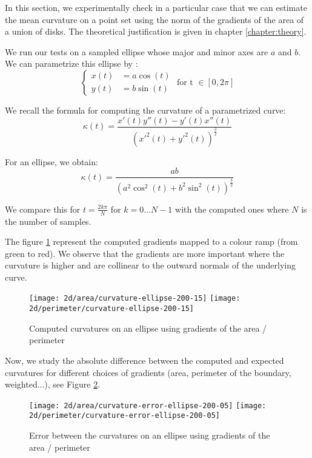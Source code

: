 In this section, we experimentally check in a particular case that we can
estimate the mean curvature on a point set using the norm of the gradients of
the area of a union of disks. The theoretical justification is given in chapter
\ref{chapter:theory}.

We run our tests on a sampled ellipse whose major and minor axes are $ a $ and $
b $. We can parametrize this ellipse by :
$$
\begin{cases}
    x(t) &= a \cos (t) \\
    y(t) &= b \sin (t)
\end{cases}
\text{ for t } \in [ 0, 2\pi ]
$$

We recall the formula for computing the curvature of a parametrized curve:
\begin{equation}
    \kappa(t) = \frac{x'(t) y''(t) - y'(t) x''(t)}{(x'^2(t) +
        y'^2(t))^{\frac{3}{2}} }
\end{equation}

For an ellipse, we obtain:
$$ \kappa(t) = \frac{ab}{(a^2 \cos^2(t) + b^2 \sin^2(t))^{\frac{3}{2}} } $$

We compare this for $ t = \frac{2 k \pi}{N} $ for $ k = 0 \ldots N - 1 $ with
the computed ones where $ N $ is the number of samples.

The figure \ref{fig:2d-curvature-ellipse} represent the computed gradients mapped
to a colour ramp (from green to red). We observe that the gradients are more
important where the curvature is higher and are collinear to the outward normals
of the underlying curve.

\begin{figure}[h]
    \centering

    \texttt{[image: 2d/area/curvature-ellipse-200-15]}
    \texttt{[image: 2d/perimeter/curvature-ellipse-200-15]}
    \caption{Computed curvatures on an ellipse using gradients of the area /
        perimeter}
    \label{fig:2d-curvature-ellipse}
\end{figure}


Now, we study the absolute difference between the computed and expected
curvatures for different choices of gradients (area, perimeter of the boundary,
weighted...), see Figure \ref{fig:2d-curvature-error-ellipse}.

\begin{figure}[h]
    \centering

    \texttt{[image: 2d/area/curvature-error-ellipse-200-05]}
    \texttt{[image: 2d/perimeter/curvature-error-ellipse-200-05]}
    \caption{Error between the curvatures on an ellipse using gradients of the
        area / perimeter}
    \label{fig:2d-curvature-error-ellipse}
\end{figure}

